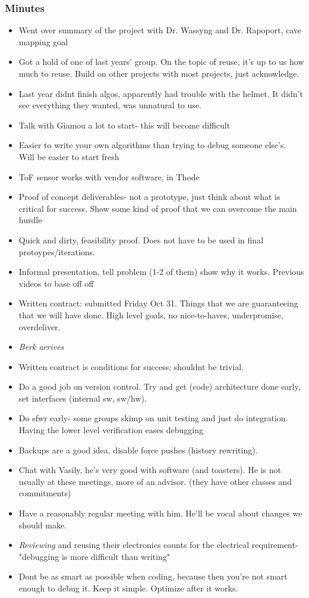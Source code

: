 		\subsubsection*{Minutes}
			\begin{itemize}
				\item Went over summary of the project with Dr. Wassyng and Dr. Rapoport, cave mapping goal
				\item Got a hold of one of last years' group. On the topic of reuse, it's up to us how much to reuse. Build on other projects with most projects, just acknowledge.
				\item Last year didnt finish algos, apparently had trouble with the helmet. It didn't see everything they wanted, was unnatural to use.
				\item Talk with Giamou a lot to start- this will become difficult
				\item Easier to write your own algorithms than trying to debug someone else's. Will be easier to start fresh
				\item ToF sensor works with vendor software, in Thode
				\item Proof of concept deliverables- not a prototype, just think about what is critical for success. Show some kind of proof that we can overcome the main hurdle
				\item Quick and dirty, feasibility proof. Does not have to be used in final protoypes/iterations. 
				\item Informal presentation, tell problem (1-2 of them) show why it works. Previous videos to base off off
				\item Written contract: submitted Friday Oct 31. Things that we are guaranteeing that we will have done. High level goals, no nice-to-haves, underpromise, overdeliver.
				\item \textit{Berk arrives}
				\item Written contract is conditions for success; shouldnt be trivial.
				\item Do a good job on version control. Try and get (code) architecture done early, set interfaces (internal sw, sw/hw).
				\item Do sfwr early- some groups skimp on unit testing and just do integration. Having the lower level verification eases debugging
				\item Backups are a good idea, disable force pushes (history rewriting).
				\item Chat with Vasily, he's very good with software (and toasters). He is not usually at these meetings, more of an advisor. (they have other classes and commitments)
				\item Have a reasonably regular meeting with him. He'll be vocal about changes we should make.
				\item \textit{Reviewing} and reusing their electronics counts for the electrical requirement- "debugging is more difficult than writing"
				\item Dont be as smart as possible when coding, because then you're not smart enough to debug it. Keep it simple. Optimize after it works.
			\end{itemize}


